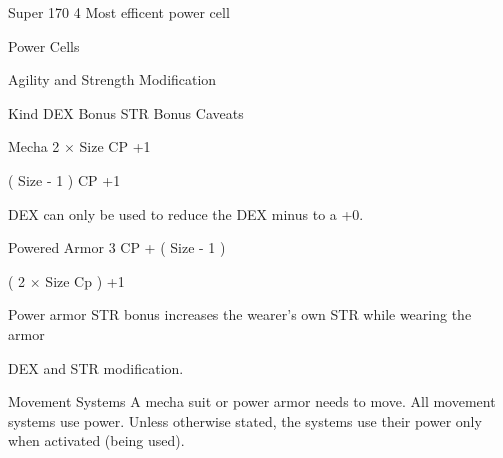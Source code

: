 \documentclass[twoside]{book}
\begin{document}
                      
                       Super   
                       170   
                       4   
                       Most efficent power cell   
                      
                    
                  Power Cells  
                  
                
                
                Agility and Strength Modification  
                  
                    
                      
                       Kind   
                       DEX Bonus   
                       STR Bonus   
                       Caveats   
                      
                      
                       Mecha   
                                   2
                            \ensuremath{\times}    Size CP  
                              +1    
                             
                        
                                 (   
                         Size    -    1    )
                            CP        +1
                               
                        
                         DEX can only be used to reduce the DEX
                         minus to a +0. 
                      
                      
                       Powered Armor   
                                   3
                            CP        +
                            (    Size    -
                            1    )    
                             
                        
                                   (
                            2    \ensuremath{\times}   
                         Size Cp    )      
                          +1         
                        
                         Power armor STR bonus increases the
                         wearer's own STR while wearing the armor
                         
                      
                    
                  DEX and STR modification.  
                  
                
                
                Movement Systems  
                    A mecha suit or power armor needs to move. All
                   movement systems use power. Unless otherwise stated,
                   the systems use their power only when activated (being
                   used). 
                  
\end{document}
